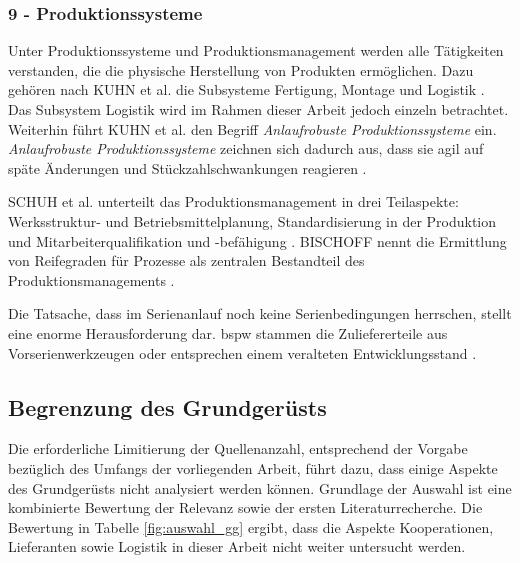 \subsubsection*{9 - Produktionssysteme}
Unter Produktionssysteme und Produktionsmanagement werden alle Tätigkeiten verstanden, die die physische Herstellung von Produkten ermöglichen. Dazu gehören nach KUHN et al. die Subsysteme Fertigung, Montage und Logistik \autocite{Kuhn2002}. Das Subsystem Logistik wird im Rahmen dieser Arbeit jedoch einzeln betrachtet. Weiterhin führt KUHN et al. den Begriff \textit{Anlaufrobuste Produktionssysteme} ein. \textit{Anlaufrobuste Produktionssysteme} zeichnen sich dadurch aus, dass sie agil auf späte Änderungen und Stückzahlschwankungen reagieren \autocite[20]{Bischoff2007}. 

SCHUH et al. unterteilt das Produktionsmanagement in drei Teilaspekte: Werksstruktur- und Betriebsmittelplanung, Standardisierung in der Produktion und Mitarbeiterqualifikation und {-befähigung} \autocite[177]{Schuh2008}. 
BISCHOFF nennt die Ermittlung von Reifegraden für Prozesse als zentralen Bestandteil des Produktionsmanagements \autocite[20]{Bischoff2007}. 

Die Tatsache, dass im Serienanlauf noch keine Serienbedingungen herrschen, stellt eine enorme Herausforderung dar. \Gls{bspw} stammen die Zuliefererteile aus Vorserienwerkzeugen oder entsprechen einem veralteten Entwicklungsstand \autocite[21]{Kuhn2002}.

\subsection*{Begrenzung des Grundgerüsts}
Die erforderliche Limitierung der Quellenanzahl, entsprechend der Vorgabe bezüglich des Umfangs der vorliegenden Arbeit, führt dazu, dass einige Aspekte des Grundgerüsts nicht analysiert werden können.
Grundlage der Auswahl ist eine kombinierte Bewertung der Relevanz sowie der ersten Literaturrecherche. 
Die Bewertung in Tabelle \ref{fig:auswahl_gg} ergibt, dass die Aspekte Kooperationen, Lieferanten sowie Logistik in dieser Arbeit nicht weiter untersucht werden. 

